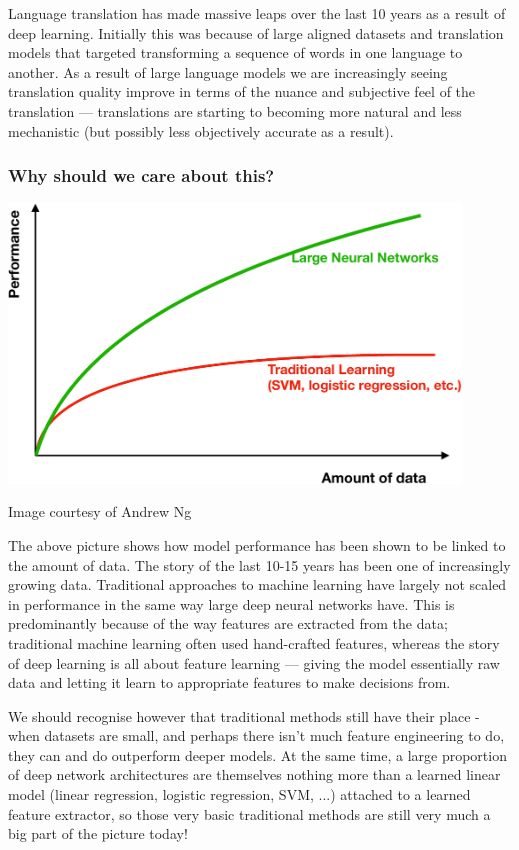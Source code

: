 \documentclass[]{article}
\begin{document}
Language translation has made massive leaps over the last 10 years as a result of deep learning. Initially this was because of large aligned datasets and translation models that targeted transforming a sequence of words in one language to another. As a result of large language models we are increasingly seeing translation quality improve in terms of the nuance and subjective feel of the translation --- translations are starting to becoming more natural and less mechanistic (but possibly less objectively accurate as a result).

\begin{frame}
	\frametitle{Why should we care about this?}
		\centering
		\includegraphics[width=0.9\textwidth]{Fig1.pdf}
		\par\footnotesize{Image courtesy of Andrew Ng}
\end{frame}

The above picture shows how model performance has been shown to be linked to the amount of data. The story of the last 10-15 years has been one of increasingly growing data. Traditional approaches to machine learning have largely not scaled in performance in the same way large deep neural networks have. This is predominantly because of the way features are extracted from the data; traditional machine learning often used hand-crafted features, whereas the story of deep learning is all about feature learning --- giving the model essentially raw data and letting it learn to appropriate features to make decisions from. 

We should recognise however that traditional methods still have their place - when datasets are small, and perhaps there isn't much feature engineering to do, they can and do outperform deeper models. At the same time, a large proportion of deep network architectures are themselves nothing more than a learned linear model (linear regression, logistic regression, SVM, ...) attached to a learned feature extractor, so those very basic traditional methods are still very much a big part of the picture today!
\end{document}
